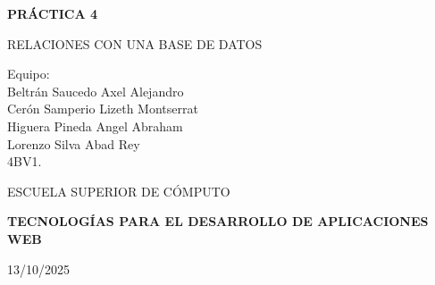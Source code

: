 \documentclass[12pt]{article}
\begin{document}

\begin{titlepage}
    \thispagestyle{empty}
    
    
    \begin{spacing}{1.5}
        {\Huge \bfseries \noindent PRÁCTICA 4}
        \vspace{10pt}

        {\LARGE RELACIONES CON UNA BASE DE DATOS}
        
        \vspace{1cm}
        
        {\Large Equipo:} \\
        {\Large Beltrán Saucedo Axel Alejandro} \\
        {\Large Cerón Samperio Lizeth Montserrat} \\
        {\Large Higuera Pineda Angel Abraham} \\
        {\Large Lorenzo Silva Abad Rey} \\
        {\Large 4BV1.}
    \end{spacing}
    
    \vspace{1.5cm}

    \begin{minipage}{7.5cm} %
        {\Large ESCUELA SUPERIOR DE CÓMPUTO}
    \end{minipage}

    \vfill %

    \begin{flushleft}
        {\Large \color{black}
        \textbf{TECNOLOGÍAS PARA EL DESARROLLO DE APLICACIONES WEB}}
        
        \vspace{0.5cm}
        
        13/10/2025
    \end{flushleft}
    \vspace{1cm}
\end{titlepage}
\end{document}
